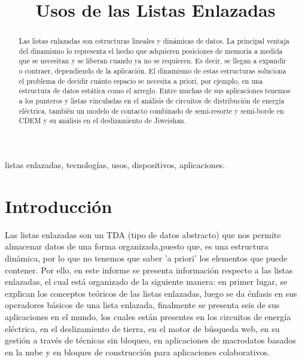 \documentclass[10pt,journal]{IEEEtran}
\begin{document}
\title{Usos de las Listas Enlazadas \\}
\author{
}
\maketitle
\begin{abstract}
Las listas enlazadas son estructuras lineales y dinámicas de datos. La principal ventaja del dinamismo lo representa el hecho que adquieren posiciones de memoria a medida que se necesitan y se liberan cuando ya no se requieren. Es decir, se llegan a expandir o contraer, dependiendo de la aplicación. El dinamismo de estas estructuras soluciona el problema de decidir cuánto espacio se necesita a priori, por ejemplo, en una estructura de datos estática como el arreglo. Entre muchas de sus aplicaciones tenemos a los punteros y listas vinculadas en el análisis de circuitos de distribución de energía eléctrica, también un modelo de contacto combinado de semi-resorte y semi-borde en CDEM y su análisis en el deslizamiento de Jiweishan.
\end{abstract}

\begin{IEEEkeywords}
listas enlazadas, tecnologías, usos, dispositivos, aplicaciones.
\end{IEEEkeywords}

\section{\textbf{Introducción}}
Las listas enlazadas son un TDA (tipo de datos abstracto) que nos permite almacenar datos de una forma organizada,puesto que, es una estructura dinámica, por lo que no tenemos que saber 'a priori' los elementos que puede contener. Por ello, en este informe se presenta información respecto a las listas enlazadas, el cual está organizado de la siguiente manera: en primer lugar, se explican los conceptos teóricos de las listas enlazadas, luego se da énfasis en sus operadores básicos de una lista enlazada, finalmente se presenta seis de sus aplicaciones en el mundo, los cuales están presentes en los circuitos de energía eléctrica, en el deslizamiento de tierra, en el motor de búsqueda web, en su gestión a través de técnicas sin bloqueo, en aplicaciones de macrodatos basados en la nube y en bloques de construcción para aplicaciones colaborativos.
\end{document}
